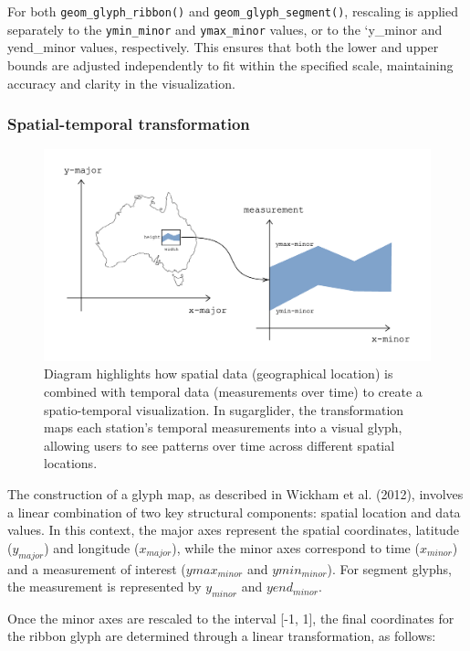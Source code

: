 For both \texttt{geom\_glyph\_ribbon()} and \texttt{geom\_glyph\_segment()}, rescaling is applied separately to the \texttt{ymin\_minor} and \texttt{ymax\_minor} values, or to the `y\_minor and yend\_minor values, respectively. This ensures that both the lower and upper bounds are adjusted independently to fit within the specified scale, maintaining accuracy and clarity in the visualization.

\subsubsection{Spatial-temporal transformation}\label{spatial-temporal-transformation}

\begin{figure}
\includegraphics[width=17.71in]{figures/diagram-transformation} \caption{Diagram highlights how spatial data (geographical location) is combined with temporal data (measurements over time) to create a spatio-temporal visualization. In sugarglider, the transformation maps each station's temporal measurements into a visual glyph, allowing users to see patterns over time across different spatial locations.}\label{fig:unnamed-chunk-7}
\end{figure}

The construction of a glyph map, as described in Wickham et al. (2012), involves a linear combination of two key structural components: spatial location and data values. In this context, the major axes represent the spatial coordinates, latitude (\(y_{major}\)) and longitude (\(x_{major}\)), while the minor axes correspond to time (\(x_{minor}\)) and a measurement of interest (\(ymax_{minor}\) and \(ymin_{minor}\)). For segment glyphs, the measurement is represented by \(y_{minor}\) and \(yend_{minor}\).

Once the minor axes are rescaled to the interval {[}-1, 1{]}, the final coordinates for the ribbon glyph are determined through a linear transformation, as follows:

